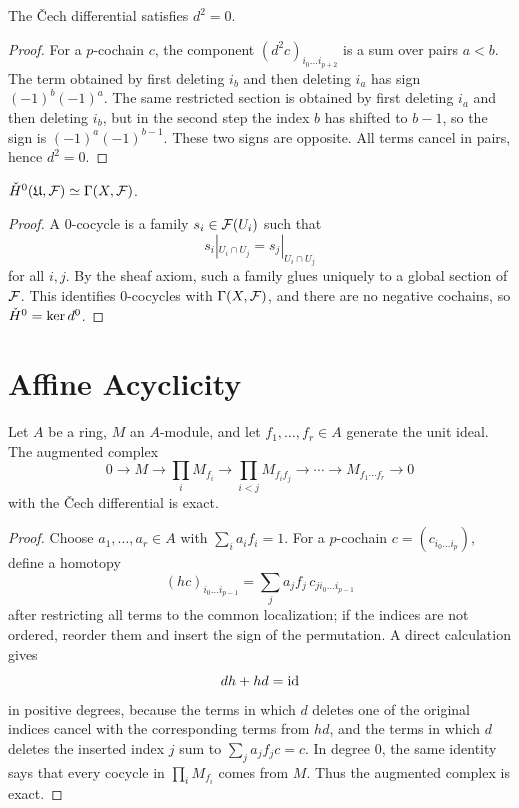 \begin{proposition}
The \v{C}ech differential satisfies \(d^2=0\).
\end{proposition}

\begin{proof}
For a \(p\)-cochain \(c\), the component \((d^2c)_{i_0\ldots i_{p+2}}\) is a
sum over pairs \(a<b\).  The term obtained by first deleting \(i_b\) and then
deleting \(i_a\) has sign \((-1)^b(-1)^a\).  The same restricted section is
obtained by first deleting \(i_a\) and then deleting \(i_b\), but in the second
step the index \(b\) has shifted to \(b-1\), so the sign is
\((-1)^a(-1)^{b-1}\).  These two signs are opposite.  All terms cancel in
pairs, hence \(d^2=0\).
\end{proof}

\begin{proposition}
\(\check{H}^0(\mathfrak{U},\mathcal{F})\simeq\Gamma(X,\mathcal{F})\).
\end{proposition}

\begin{proof}
A \(0\)-cocycle is a family \(s_i\in\mathcal{F}(U_i)\) such that
\[
    s_i|_{U_i\cap U_j}=s_j|_{U_i\cap U_j}
\]
for all \(i,j\).  By the sheaf axiom, such a family glues uniquely to a global
section of \(\mathcal{F}\).  This identifies \(0\)-cocycles with \(\Gamma(X,\mathcal{F})\), and
there are no negative cochains, so \(\check{H}^0=\ker d^0\).
\end{proof}

\section{Affine Acyclicity}

\begin{lemma}
Let \(A\) be a ring, \(M\) an \(A\)-module, and let \(f_1,\ldots,f_r\in A\)
generate the unit ideal.  The augmented complex
\[
0\to M\to \prod_i M_{f_i}\to \prod_{i<j}M_{f_if_j}\to\cdots
\to M_{f_1\cdots f_r}\to0
\]
with the \v{C}ech differential is exact.
\end{lemma}

\begin{proof}
Choose \(a_1,\ldots,a_r\in A\) with \(\sum_i a_i f_i=1\).  For a
\(p\)-cochain \(c=(c_{i_0\ldots i_p})\), define a homotopy
\[
    (hc)_{i_0\ldots i_{p-1}}
    =
    \sum_j a_j f_j\,
    c_{j i_0\ldots i_{p-1}}
\]
after restricting all terms to the common localization; if the indices are not
ordered, reorder them and insert the sign of the permutation.  A direct
calculation gives
\[
    dh+hd=\operatorname{id}
\]
in positive degrees, because the terms in which \(d\) deletes one of the
original indices cancel with the corresponding terms from \(hd\), and the terms
in which \(d\) deletes the inserted index \(j\) sum to
\(\sum_j a_jf_j c=c\).  In degree \(0\), the same identity says that every
cocycle in \(\prod_i M_{f_i}\) comes from \(M\).  Thus the augmented complex is
exact.
\end{proof}

